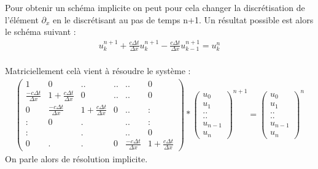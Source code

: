 \documentclass[12pt]{article}
\begin{document}
\noindent Pour obtenir un schéma implicite on peut pour cela changer la discrétisation de l'élément $\partial_x$ en le discrétisant au pas de temps n+1. 
Un résultat possible est alors le schéma suivant :
\begin{eqnarray*}
         u_k^{n+1} +\frac{c\Delta t}{\Delta x}u_k^{n+1}-\frac{c\Delta t}{\Delta x}u_{k-1}^{n+1}=u_k^n
\end{eqnarray*}
\\Matriciellement celà vient à résoudre le système :
\begin{eqnarray*}
        \begin{pmatrix}
   1 & 0 & .. & .. &.. & 0 \\
   \frac{-c\Delta t}{\Delta x} & 1 + \frac{c\Delta t}{\Delta x} &0 &..&.. &0 \\
   0 & \frac{-c\Delta t}{\Delta x} & 1 + \frac{c\Delta t}{\Delta x} & 0 &.. & : \\
   : & 0 & . &  &.. & : \\
   : &  & . &  &.. & 0 \\
   0 & . & . & 0 &\frac{-c\Delta t}{\Delta x} & 1 + \frac{c\Delta t}{\Delta x}
   
\end{pmatrix}
*         \begin{pmatrix}
  u_0\\
  u_1\\
  ..\\
  ..\\
  u_{n-1}\\
  u_n
\end{pmatrix}^{n+1}
= \begin{pmatrix}
  u_0\\
  u_1\\
  ..\\
  ..\\
  u_{n-1}\\
  u_n
\end{pmatrix}^n
\end{eqnarray*}
On parle alors de résolution implicite.
\end{document}
